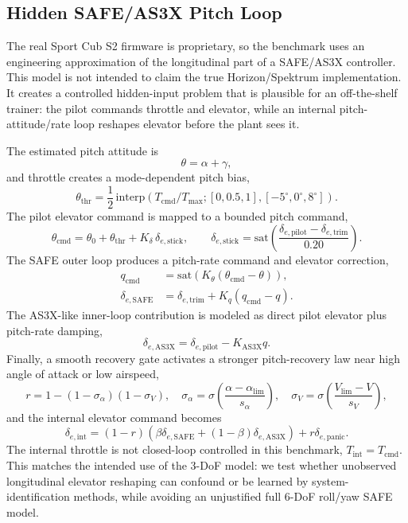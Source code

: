 \documentclass[11pt]{article}
\begin{document}
\subsection*{Hidden SAFE/AS3X Pitch Loop}
The real Sport Cub S2 firmware is proprietary, so the benchmark uses an
engineering approximation of the longitudinal part of a SAFE/AS3X controller.
This model is not intended to claim the true Horizon/Spektrum implementation.
It creates a controlled hidden-input problem that is plausible for an
off-the-shelf trainer: the pilot commands throttle and elevator, while an
internal pitch-attitude/rate loop reshapes elevator before the plant sees it.

The estimated pitch attitude is
\[
\theta = \alpha + \gamma,
\]
and throttle creates a mode-dependent pitch bias,
\begin{equation}
    \theta_{\mathrm{thr}} =
    \frac{1}{2}\,\mathrm{interp}
    \left(T_{\mathrm{cmd}}/T_{\max};
    [0,0.5,1],[-5^\circ,0^\circ,8^\circ]\right).
\end{equation}
The pilot elevator command is mapped to a bounded pitch command,
\begin{equation}
    \theta_{\mathrm{cmd}}
    = \theta_0 + \theta_{\mathrm{thr}}
    + K_{\delta}\,\delta_{e,\mathrm{stick}},
    \qquad
    \delta_{e,\mathrm{stick}}
    = \mathrm{sat}\left(\frac{\delta_{e,\mathrm{pilot}}-\delta_{e,\mathrm{trim}}}{0.20}\right).
\end{equation}
The SAFE outer loop produces a pitch-rate command and elevator correction,
\begin{align}
    q_{\mathrm{cmd}} &= \mathrm{sat}\left(K_\theta(\theta_{\mathrm{cmd}}-\theta)\right),\\
    \delta_{e,\mathrm{SAFE}} &= \delta_{e,\mathrm{trim}} + K_q(q_{\mathrm{cmd}}-q).
\end{align}
The AS3X-like inner-loop contribution is modeled as direct pilot elevator plus
pitch-rate damping,
\begin{equation}
    \delta_{e,\mathrm{AS3X}} = \delta_{e,\mathrm{pilot}} - K_{\mathrm{AS3X}}q.
\end{equation}
Finally, a smooth recovery gate activates a stronger pitch-recovery law near
high angle of attack or low airspeed,
\begin{equation}
    r = 1 - (1-\sigma_\alpha)(1-\sigma_V),
    \quad
    \sigma_\alpha=\sigma\!\left(\frac{\alpha-\alpha_{\lim}}{s_\alpha}\right),
    \quad
    \sigma_V=\sigma\!\left(\frac{V_{\lim}-V}{s_V}\right),
\end{equation}
and the internal elevator command becomes
\begin{equation}
    \delta_{e,\mathrm{int}}
    = (1-r)\left(\beta\delta_{e,\mathrm{SAFE}}+(1-\beta)\delta_{e,\mathrm{AS3X}}\right)
    + r\delta_{e,\mathrm{panic}}.
    \label{eq:safe_loop}
\end{equation}
The internal throttle is not closed-loop controlled in this benchmark,
$T_{\mathrm{int}}=T_{\mathrm{cmd}}$. This matches the intended use of the
3-DoF model: we test whether unobserved longitudinal elevator reshaping can
confound or be learned by system-identification methods, while avoiding an
unjustified full 6-DoF roll/yaw SAFE model.
\end{document}
